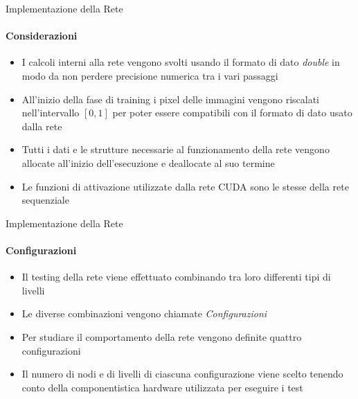 \documentclass[
 ]{beamer}
\begin{document}
\begin{frame}{Implementazione della Rete}
    \framesubtitle{Considerazioni}
    \begin{itemize} [<+->]
        \setlength\itemsep{1.5em}
        \item \large I calcoli interni alla rete vengono svolti usando il formato di dato \emph{double} in modo da non perdere precisione numerica tra i vari passaggi
        \item \large All'inizio della fase di training i pixel delle immagini vengono riscalati nell'intervallo $[0,1]$ per poter essere compatibili con il formato di dato usato dalla rete
        \item \large Tutti i dati e le strutture necessarie al funzionamento della rete vengono allocate all'inizio dell'esecuzione e deallocate al suo termine
        \item \large Le funzioni di attivazione utilizzate dalla rete CUDA sono le stesse della rete sequenziale
    \end{itemize} 
    
\end{frame}

\begin{frame}{Implementazione della Rete}
    \framesubtitle{Configurazioni}
    \smallskip
    \begin{itemize} [<+->]
        \setlength\itemsep{2em}
        \item \large Il testing della rete viene effettuato combinando tra loro differenti tipi di livelli
        \item \large Le diverse combinazioni vengono chiamate \emph{Configurazioni}
        \item \large Per studiare il comportamento della rete vengono definite quattro configurazioni
        \item \large Il numero di nodi e di livelli di ciascuna configurazione viene scelto tenendo conto della componentistica hardware utilizzata per eseguire i test
    \end{itemize}     
\end{frame}
\end{document}

